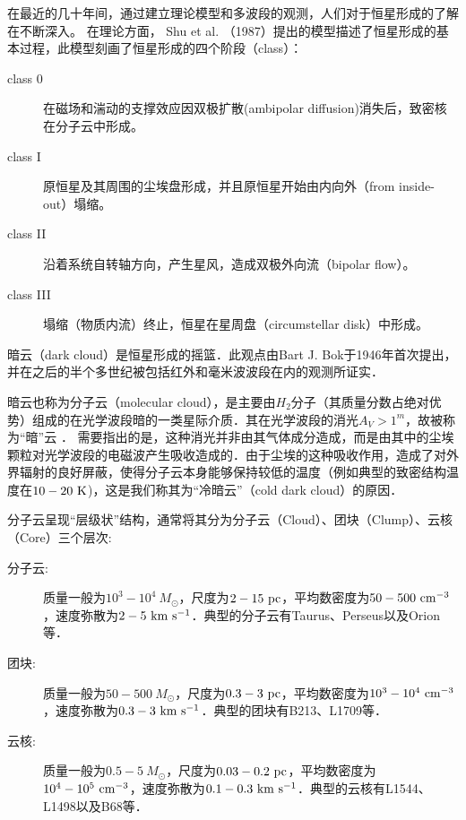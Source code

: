 \documentclass[UTF8, nocolorlinks]{pkuthss}
\begin{document}
		在最近的几十年间，通过建立理论模型和多波段的观测，人们对于恒星形成的了解在不断深入。 在理论方面， Shu et al. （1987）提出的模型\supercite{shu1987star}描述了恒星形成的基本过程，此模型刻画了恒星形成的四个阶段（class）：

		\begin{description}
			\item   [class 0]在磁场和湍动的支撑效应因双极扩散(ambipolar diffusion)消失后，致密核在分子云中形成。
			\item   [class I]原恒星及其周围的尘埃盘形成，并且原恒星开始由内向外（from inside-out）塌缩。
			\item  [class II]沿着系统自转轴方向，产生星风，造成双极外向流（bipolar flow）。
			\item [class III]塌缩（物质内流）终止，恒星在星周盘（circumstellar disk）中形成。
		\end{description}

		暗云（dark cloud）是恒星形成的摇篮．此观点由Bart J. Bok于1946年首次提出\supercite{1948HarMo...7...53B}，并在之后的半个多世纪被包括红外和毫米波波段在内的观测所证实\supercite{shu1987star,2007ARA&A..45..339B}．

		暗云也称为分子云（molecular cloud），是主要由$H_2$分子（其质量分数占绝对优势）组成的在光学波段暗的一类星际介质．其在光学波段的消光$A_V>1^{m}$，故被称为“暗”云\supercite{2007ARA&A..45..339B} ． 需要指出的是，这种消光并非由其气体成分造成，而是由其中的尘埃颗粒对光学波段的电磁波产生吸收造成的．由于尘埃的这种吸收作用，造成了对外界辐射的良好屏蔽，使得分子云本身能够保持较低的温度（例如典型的致密结构温度在$10-20\rm\ K$\supercite{1983ApJ...265..223B})，这是我们称其为“冷暗云”（cold dark cloud）的原因．

		分子云呈现“层级状”结构\supercite{1994ApJ...423..681V}，通常将其分为分子云（Cloud）、团块（Clump）、云核（Core）三个层次\supercite{2007ARA&A..45..339B,2000prpl.conf...97W}:
		\begin{description}
			\item[分子云:] 质量一般为$10^3-10^4\ M_{\odot}$，尺度为$2-15\rm\ pc$，平均数密度为$50-500\rm\ cm^{-3}$，速度弥散为$2- 5\rm\ km\ s^{-1}$\supercite{2007ARA&A..45..339B}．典型的分子云有Taurus、Perseus以及Orion等．

			\item[团块:] 质量一般为$50-500\ M_{\odot}$，尺度为$0.3-3\rm\ pc$，平均数密度为$10^3-10^4\rm\ cm^{-3}$，速度弥散为$0.3- 3\rm\ km\ s^{-1}$\supercite{2007ARA&A..45..339B}．典型的团块有B213、L1709等\supercite{2007ARA&A..45..339B}．

			\item[云核:] 质量一般为$0.5-5\ M_{\odot}$，尺度为$0.03-0.2\rm\ pc$，平均数密度为$10^4-10^5\rm\ cm^{-3}$，速度弥散为$0.1- 0.3\rm\ km\ s^{-1}$\supercite{2007ARA&A..45..339B}．典型的云核有L1544、L1498以及B68等\supercite{2007ARA&A..45..339B}．
		\end{description}
\end{document}
